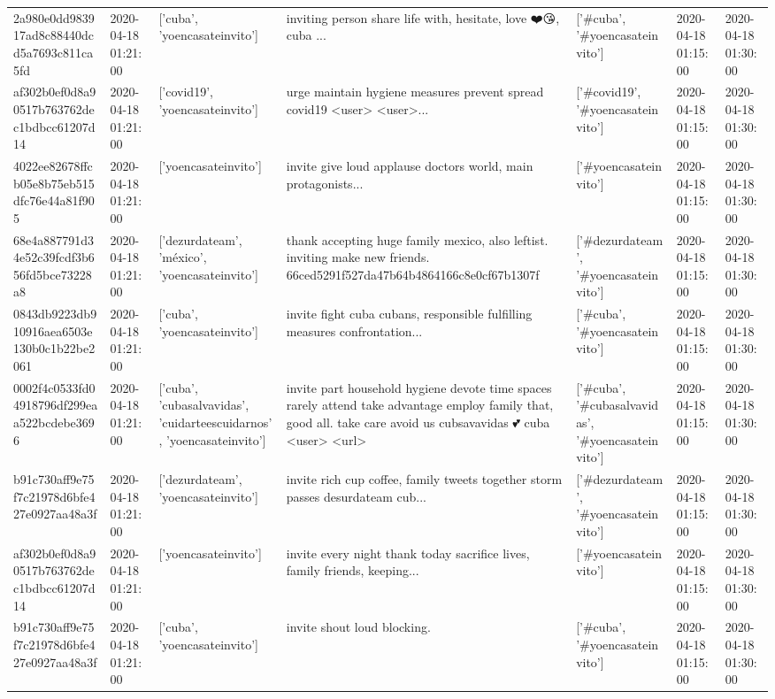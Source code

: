 \begin{tabular}{lllllll}
2a980e0dd983917ad8c88440dcd5a7693c811ca5fd & 2020-04-18 01:21:00 & ['cuba', 'yoencasateinvito'] & inviting person share life with, hesitate, love ❤️😘, cuba ... & ['#cuba', '#yoencasateinvito'] & 2020-04-18 01:15:00 & 2020-04-18 01:30:00 \\
af302b0ef0d8a90517b763762dec1bdbcc61207d14 & 2020-04-18 01:21:00 & ['covid19', 'yoencasateinvito'] & urge maintain hygiene measures prevent spread covid19 <user> <user>... & ['#covid19', '#yoencasateinvito'] & 2020-04-18 01:15:00 & 2020-04-18 01:30:00 \\
4022ee82678ffcb05e8b75eb515dfc76e44a81f905 & 2020-04-18 01:21:00 & ['yoencasateinvito'] & invite give loud applause doctors world, main protagonists... & ['#yoencasateinvito'] & 2020-04-18 01:15:00 & 2020-04-18 01:30:00 \\
68e4a887791d34e52c39fcdf3b656fd5bce73228a8 & 2020-04-18 01:21:00 & ['dezurdateam', 'méxico', 'yoencasateinvito'] & thank accepting huge family mexico, also leftist. inviting make new friends. 66ced5291f527da47b64b4864166c8e0cf67b1307f & ['#dezurdateam', '#yoencasateinvito'] & 2020-04-18 01:15:00 & 2020-04-18 01:30:00 \\
0843db9223db910916aea6503e130b0c1b22be2061 & 2020-04-18 01:21:00 & ['cuba', 'yoencasateinvito'] & invite fight cuba cubans, responsible fulfilling measures confrontation... & ['#cuba', '#yoencasateinvito'] & 2020-04-18 01:15:00 & 2020-04-18 01:30:00 \\
0002f4c0533fd04918796df299eaa522bcdebe3696 & 2020-04-18 01:21:00 & ['cuba', 'cubasalvavidas', 'cuidarteescuidarnos', 'yoencasateinvito'] & invite part household hygiene devote time spaces rarely attend take advantage employ family that, good all. take care avoid us cubsavavidas 💕 cuba <user> <url> & ['#cuba', '#cubasalvavidas', '#yoencasateinvito'] & 2020-04-18 01:15:00 & 2020-04-18 01:30:00 \\
b91c730aff9e75f7c21978d6bfe427e0927aa48a3f & 2020-04-18 01:21:00 & ['dezurdateam', 'yoencasateinvito'] & invite rich cup coffee, family tweets together storm passes desurdateam cub... & ['#dezurdateam', '#yoencasateinvito'] & 2020-04-18 01:15:00 & 2020-04-18 01:30:00 \\
af302b0ef0d8a90517b763762dec1bdbcc61207d14 & 2020-04-18 01:21:00 & ['yoencasateinvito'] & invite every night thank today sacrifice lives, family friends, keeping... & ['#yoencasateinvito'] & 2020-04-18 01:15:00 & 2020-04-18 01:30:00 \\
b91c730aff9e75f7c21978d6bfe427e0927aa48a3f & 2020-04-18 01:21:00 & ['cuba', 'yoencasateinvito'] & invite shout loud blocking. & ['#cuba', '#yoencasateinvito'] & 2020-04-18 01:15:00 & 2020-04-18 01:30:00 \\

\end{tabular}
